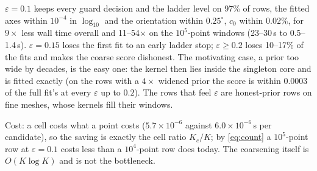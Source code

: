 \documentclass[11pt]{article}
\newcommand{\eps}{\varepsilon}
\begin{document}
$\eps = 0.1$ keeps every guard decision and the ladder level on 97\% of
rows, the fitted axes within $10^{-4}$ in $\log_{10}$ and the orientation
within $0.25^\circ$, $c_0$ within $0.02\%$, for $9\times$ less wall time
overall and 11--54$\times$ on the $10^5$-point windows (23--30\,s to
0.5--1.4\,s). $\eps = 0.15$ loses the first fit to an early ladder stop;
$\eps \ge 0.2$ loses 10--17\% of the fits and makes the coarse score
dishonest. The motivating case, a prior too wide by decades, is the easy one:
the kernel then lies inside the singleton core and is fitted exactly (on the
rows with a $4\times$ widened prior the score is within $0.0003$ of the full
fit's at every $\eps$ up to $0.2$). The rows that feel $\eps$ are
honest-prior rows on fine meshes, whose kernels fill their windows.

Cost: a cell costs what a point costs ($5.7\times 10^{-6}$ against
$6.0\times 10^{-6}$\,s per candidate), so the saving is exactly the cell
ratio $K_c/K$; by \eqref{eq:count} a $10^5$-point row at $\eps = 0.1$ costs
less than a $10^4$-point row does today. The coarsening itself is
$O(K\log K)$ and is not the bottleneck.
\end{document}
